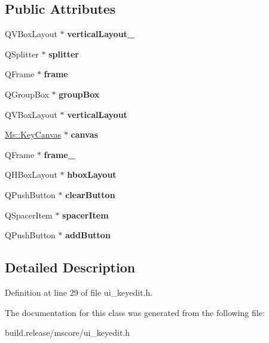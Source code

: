 \subsection*{Public Attributes}
\begin{DoxyCompactItemize}
\item 
\mbox{\label{class_ui___key_edit_a7eae2103f1d5bac6e3803354f13fa483}} 
Q\+V\+Box\+Layout $\ast$ {\bfseries vertical\+Layout\+\_}
\item 
\mbox{\label{class_ui___key_edit_afd3bbdda4b95dc9e63d118584f47beb6}} 
Q\+Splitter $\ast$ {\bfseries splitter}
\item 
\mbox{\label{class_ui___key_edit_a2b354ab207504229e32e47b8f056cfa0}} 
Q\+Frame $\ast$ {\bfseries frame}
\item 
\mbox{\label{class_ui___key_edit_a02fb58db06e9fe83caca97df8f92e633}} 
Q\+Group\+Box $\ast$ {\bfseries group\+Box}
\item 
\mbox{\label{class_ui___key_edit_aea0b6d979e5793a1910293d5b5e2e4c0}} 
Q\+V\+Box\+Layout $\ast$ {\bfseries vertical\+Layout}
\item 
\mbox{\label{class_ui___key_edit_a52077c345e98cf03bdf44dfd9a9ac497}} 
\hyperlink{class_ms_1_1_key_canvas}{Ms\+::\+Key\+Canvas} $\ast$ {\bfseries canvas}
\item 
\mbox{\label{class_ui___key_edit_ae0cead23c30f339b9a623913d8e45b30}} 
Q\+Frame $\ast$ {\bfseries frame\+\_}
\item 
\mbox{\label{class_ui___key_edit_ac72200faba0f06945d7f73d526b4587c}} 
Q\+H\+Box\+Layout $\ast$ {\bfseries hbox\+Layout}
\item 
\mbox{\label{class_ui___key_edit_a94834c3962f98ddeac7eb0c62323d049}} 
Q\+Push\+Button $\ast$ {\bfseries clear\+Button}
\item 
\mbox{\label{class_ui___key_edit_a1429b801e07a11a21eaa13c7a3fc60b4}} 
Q\+Spacer\+Item $\ast$ {\bfseries spacer\+Item}
\item 
\mbox{\label{class_ui___key_edit_a25f79888c5b9f5abc2cf3d6379e0cdbb}} 
Q\+Push\+Button $\ast$ {\bfseries add\+Button}
\end{DoxyCompactItemize}


\subsection{Detailed Description}


Definition at line 29 of file ui\+\_\+keyedit.\+h.



The documentation for this class was generated from the following file\+:\begin{DoxyCompactItemize}
\item 
build.\+release/mscore/ui\+\_\+keyedit.\+h\end{DoxyCompactItemize}
